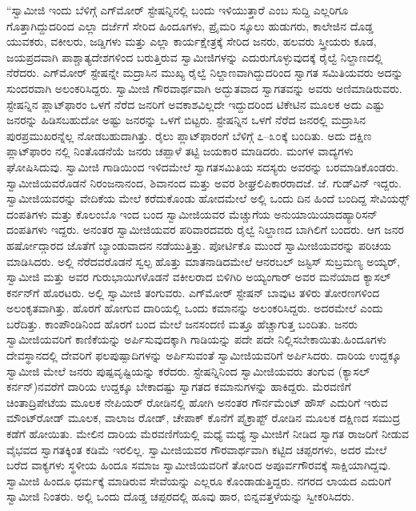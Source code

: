 \vskip 2pt

 “ಸ್ವಾಮೀಜಿ ಇಂದು ಬೆಳಿಗ್ಗೆ ಎಗ್‍ಮೋರ್ ಸ್ಟೇಷನ್ನಿನಲ್ಲಿ ಬಂದು ಇಳಿಯುತ್ತಾರೆ ಎಂಬ ಸುದ್ದಿ ಎಲ್ಲರಿಗೂ ಗೊತ್ತಾಗಿದ್ದುದರಿಂದ ಎಲ್ಲಾ ದರ್ಜೆಗೆ ಸೇರಿದ ಹಿಂದೂಗಳು, ಪ್ರೈಮರಿ ಸ್ಕೂಲು ಹುಡುಗರು, ಕಾಲೇಜಿನ ದೊಡ್ಡ ಯುವಕರು, ವಕೀಲರು, ಜಡ್ಡಿಗಳು ಮತ್ತು ಎಲ್ಲಾ ಕಾರ್ಯಕ್ಷೇತ್ರಕ್ಕೆ ಸೇರಿದ ಜನರು, ಹಲವರು ಸ್ತ್ರೀಯರು ಕೂಡ, ಜಯಪ್ರದವಾಗಿ ಪಾಶ್ಚಾತ್ಯದೇಶಗಳಿಂದ ಬರುತ್ತಿರುವ ಸ್ವಾಮೀಜಿಗಳನ್ನು ಎದುರುಗೊಳ್ಳುವುದಕ್ಕೆ ರೈಲ್ವೆ ನಿಲ್ದಾಣದಲ್ಲಿ ನೆರೆದರು. ಎಗ್‍ಮೋರ್ ಸ್ಟೇಷನ್ನೇ ಮದ್ರಾಸಿನ ಮುಖ್ಯ ರೈಲ್ವೆ ನಿಲ್ದಾಣವಾಗಿದ್ದುದರಿಂದ ಸ್ವಾಗತ ಸಮಿತಿಯವರು ಅದನ್ನು ಸುಂದರವಾಗಿ ಅಲಂಕರಿಸಿದ್ದರು. ಸ್ವಾಮೀಜಿ ಗೌರವಾರ್ಥವಾಗಿ ಅದ್ಭುತವಾದ ಸ್ವಾಗತವನ್ನು ಅವರು ಅಣಿಮಾಡಿರುವರು. ಸ್ಟೇಷನ್ನಿನ ಪ್ಲಾಟ್‍ಫಾರಂ ಒಳಗೆ ನೆರೆದ ಜನರಿಗೆ ಅವಕಾಶವಿಲ್ಲದೇ ಇದ್ದುದರಿಂದ ಟಿಕೇಟಿನ ಮೂಲಕ ಅದು ಎಷ್ಟು ಜನರನ್ನು ಹಿಡಿಸಬಹುದೋ ಅಷ್ಟು ಜನರನ್ನು ಒಳಗೆ ಬಿಟ್ಟರು. ಸ್ಟೇಷನ್ನಿನ ಒಳಗೆ ನೆರೆದ ಜನರಲ್ಲಿ ಮದ್ರಾಸಿನ ಪುರಪ್ರಮುಖರನ್ನೆಲ್ಲ ನೋಡಬಹುದಾಗಿತ್ತು. ರೈಲು ಪ್ಲಾಟ್‍ಫಾರಂಗೆ ಬೆಳಿಗ್ಗೆ ೭–೩೦ಕ್ಕೆ ಬಂದಿತು. ಅದು ದಕ್ಷಿಣ ಪ್ಲಾಟ್‍ಫಾರಂ ನಲ್ಲಿ ನಿಂತೊಡನೆಯೆ ಜನರು ಚಪ್ಪಾಳೆ ತಟ್ಟಿ ಜಯಕಾರ ಮಾಡಿದರು. ಮಂಗಳ ವಾದ್ಯಗಳು ಘೋಷಿಸಿದುವು. ಸ್ವಾಮೀಜಿ ಗಾಡಿಯಿಂದ ಇಳಿದಮೇಲೆ ಸ್ವಾಗತಸಮಿತಿಯ ಸದಸ್ಯರು ಅವರನ್ನು ಬರಮಾಡಿಕೊಂಡರು. ಸ್ವಾಮೀಜಿಯವರೊಡನೆ ನಿರಂಜನಾನಂದ, ಶಿವಾನಂದ ಮತ್ತು ಅವರ ಶೀಘ್ರಲಿಪಿಕಾರರಾದ\break ಜೆ. ಜೆ. ಗುಡ್‍ವಿನ್ ಇದ್ದರು. ಸ್ವಾಮೀಜಿಯವರನ್ನು ವೇದಿಕೆಯ ಮೇಲೆ ಕರೆದುಕೊಂಡು ಹೋದಮೇಲೆ ಅಲ್ಲಿ ಒಂದು ದಿನ ಹಿಂದೆ ಬಂದಿದ್ದ ಸೇವಿಯರ್ಸ್‍‍ ದಂಪತಿಗಳು ಮತ್ತು ಕೊಲಂಬೊ ಇಂದ ಬಂದ ಸ್ವಾಮೀಜಿಯವರ ಮೆಚ್ಚುಗೆಯ ಅನುಯಾಯಿಯಾದ\break ಹ್ಯಾರಿಸನ್ ದಂಪತಿಗಳು ಇದ್ದರು. ಅನಂತರ ಸ್ವಾಮೀಜಿಯವರ ಪರಿವಾರದವರು ರೈಲ್ವೆ ನಿಲ್ದಾಣದ ಬಾಗಿಲಿಗೆ ಬಂದರು. ಆಗ ಜನರ ಹರ್ಷೋದ್ಗಾರದ ಜೊತೆಗೆ ಬ್ಯಾಂಡುವಾದನ ನಡೆಯುತ್ತಿತ್ತು. ಪೋರ್ಟಿಕೊ ಮುಂದೆ ಸ್ವಾಮೀಜಿಯವರನ್ನು ಪರಿಚಯ ಮಾಡಿಸಿದರು. ಅಲ್ಲಿ ನೆರೆದವರೊಡನೆ ಸ್ವಲ್ಪ ಹೊತ್ತು ಮಾತನಾಡಿದಮೇಲೆ ಆನರಬಲ್ ಜಸ್ಟಿಸ್ ಸುಬ್ರಮಣ್ಯ ಅಯ್ಯರ್, ಸ್ವಾಮೀಜಿ ಮತ್ತು ಅವರ ಗುರುಭಾಯಿಗಳೊಡನೆ ವಕೀಲರಾದ ಬಿಳಿಗಿರಿ ಅಯ್ಯಂಗಾರ್ ಅವರ ಮನೆಯಾದ ಕ್ಯಾಸಲ್ ಕರ್ನನ್‍ಗೆ ಹೊರಟರು. ಅಲ್ಲಿ ಸ್ವಾಮೀಜಿ ತಂಗುವರು. ಎಗ್‍ಮೋರ್ ಸ್ಟೇಷನ್ ಬಾವುಟ ತಳಿರು ತೋರಣಗಳಿಂದ ಅಲಂಕೃತವಾಗಿತ್ತು. ಹೊರಗೆ ಹೋಗುವ ದಾರಿಯಲ್ಲಿ ಒಂದು ಕಮಾನನ್ನು ಅಲಂಕರಿಸಿದ್ದರು. ಅದರಮೇಲೆ  ಎಂದು ಬರೆದಿತ್ತು. ಕಾಂಪೌಂಡಿನಿಂದ ಹೊರಗೆ ಬಂದ ಮೇಲೆ ಜನಸಂದಣಿ ಮತ್ತೂ ಹೆಚ್ಚಾಗುತ್ತ ಬಂದಿತು. ಜನರು ಸ್ವಾಮೀಜಿಯವರಿಗೆ ಕಾಣಿಕೆಯನ್ನು ಅರ್ಪಿಸುವುದಕ್ಕಾಗಿ ಗಾಡಿಯನ್ನು ಪದೇ ಪದೇ ನಿಲ್ಲಿಸಬೇಕಾಯಿತು.\break ಹಿಂದೂಗಳು ದೇವಸ್ಥಾನದಲ್ಲಿ ದೇವರಿಗೆ ಫಲಪುಷ್ಪಾದಿಗಳನ್ನು ಅರ್ಪಿಸುವಂತೆ ಸ್ವಾಮೀಜಿಯವರಿಗೆ ಅರ್ಪಿಸಿದರು. ದಾರಿಯ ಉದ್ದಕ್ಕೂ ಸ್ವಾಮೀಜಿ ಮೇಲೆ ಜನರು ಪುಷ್ಪವೃಷ್ಟಿಯನ್ನು ಕರೆದರು. ಸ್ಟೇಷನ್ನಿನಿಂದ ಸ್ವಾಮೀಜಿಯವರು ತಂಗುವ  (ಕ್ಯಾಸಲ್ ಕರ್ನನ್)‌ನವರೆಗೆ ದಾರಿಯ ಉದ್ದಕ್ಕೂ ಬೇಕಾದಷ್ಟು ಸ್ವಾಗತದ ಕಮಾನುಗಳನ್ನು ಹಾಕಿದ್ದರು. ಮೆರವಣಿಗೆ ಚಿಂತಾದ್ರಿಪೇಟೆಯ ಮೂಲಕ ನೇಪಿಯರ್ ರೋಡಿನಲ್ಲಿ ಹೋಗಿ ಅನಂತರ ಗೌರ್ನಮೆಂಟ್ ಹೌಸ್ ಎದುರಿಗೆ ಇರುವ ಮೌಂಟ್‍ರೋಡ್ ಮೂಲಕ, ವಾಲಾಜ ರೋಡ್, ಚೇಪಾಕ್ ಕೊನೆಗೆ ಪೈಕ್ರಾಪ್ಟ್ ರೋಡಿನ ಮೂಲಕ ದಕ್ಷಿಣದ ಸಮುದ್ರ ಕಡೆಗೆ ಹೋಯಿತು. ಮೇಲಿನ ದಾರಿಯ ಮೆರವಣಿಗೆಯಲ್ಲಿ ಮಧ್ಯೆ ಮಧ್ಯೆ ಸ್ವಾಮೀಜಿಗೆ ನೀಡಿದ ಸ್ವಾಗತ ರಾಜರಿಗೆ ನೀಡುವ ವೈಭವದ ಸ್ವಾಗತಕ್ಕಿಂತ ಕಡಿಮೆ ಇರಲಿಲ್ಲ. ಸ್ವಾಮೀಜಿಯವರ ಗೌರವಾರ್ಥವಾಗಿ ಕಟ್ಟಿದ ಚಪ್ಪರಗಳು, ಅದರ ಮೇಲೆ ಬರೆದ ವಾಕ್ಯಗಳು ಸ್ಥಳೀಯ ಹಿಂದೂ ಸಮಾಜ ಸ್ವಾಮೀಜಿಯವರಿಗೆ ತೋರಿದ ಅಪೂರ್ವಗೌರವಕ್ಕೆ ಸಾಕ್ಷಿಯಾಗಿದ್ದವು. ಸ್ವಾಮೀಜಿ ಹಿಂದೂ ಧರ್ಮಕ್ಕೆ ಮಾಡಿರುವ ಸೇವೆಯನ್ನು ಎಲ್ಲರೂ ಕೊಂಡಾಡುತ್ತಿದ್ದರು. ನಗರದ ಲಾಯದ ಎದುರಿಗೆ ಸ್ವಾಮೀಜಿ ನಿಂತರು. ಅಲ್ಲಿ ಒಂದು ದೊಡ್ಡ ಚಪ್ಪರದಲ್ಲಿ ಹೂವು ಹಾರ, ಬಿನ್ನವತ್ತಳೆಯನ್ನು ಸ್ವೀಕರಿಸಿದರು. 

